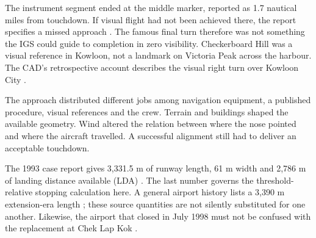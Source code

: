 The instrument segment ended at the middle marker, reported as 1.7 nautical miles from touchdown. If visual flight had not been achieved there, the report specifies a missed approach \citep[§1.8.1]{cad}. The famous final turn therefore was not something the IGS could guide to completion in zero visibility. Checkerboard Hill was a visual reference in Kowloon, not a landmark on Victoria Peak across the harbour. The CAD's retrospective account describes the visual right turn over Kowloon City \citep{cadlink}.

The approach distributed different jobs among navigation equipment, a published procedure, visual references and the crew. Terrain and buildings shaped the available geometry. Wind altered the relation between where the nose pointed and where the aircraft travelled. A successful alignment still had to deliver an acceptable touchdown.

The 1993 case report gives 3,331.5 m of runway length, 61 m width and 2,786 m of landing distance available (LDA) \citep[§1.10]{cad}. The last number governs the threshold-relative stopping calculation here. A general airport history lists a 3,390 m extension-era length \citep{cadhistory}; these source quantities are not silently substituted for one another. Likewise, the airport that closed in July 1998 must not be confused with the replacement at Chek Lap Kok \citep{cadlink}.

\par\medskip
